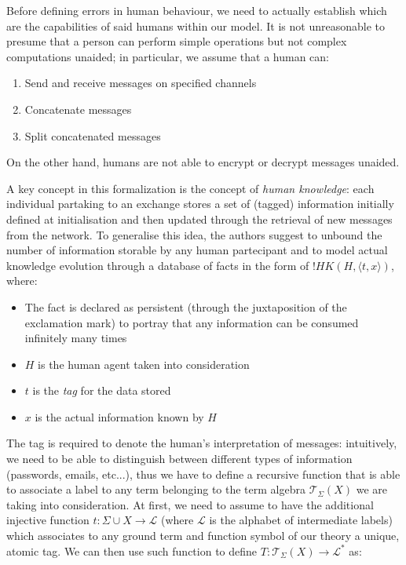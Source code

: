 \documentclass{article}
\begin{document}
Before defining errors in human behaviour, we need to actually establish which are the capabilities of said humans within our model. It is not unreasonable to presume that a person can perform simple operations but not complex computations unaided; in particular, we assume that a human can:

\begin{enumerate}
    \item Send and receive messages on specified channels
    \item Concatenate messages
    \item Split concatenated messages
\end{enumerate}

On the other hand, humans are not able to encrypt or decrypt messages unaided.

A key concept in this formalization is the concept of \textit{human knowledge}: each individual partaking to an exchange stores a set of (tagged) information initially defined at initialisation and then updated through the retrieval of new messages from the network. To generalise this idea, the authors suggest to unbound the number of information storable by any human partecipant and to model actual knowledge evolution through a database of facts in the form of $!HK(H, \langle t, x \rangle)$, where:

\begin{itemize}
    \item The fact is declared as persistent (through the juxtaposition of the exclamation mark) to portray that any information can be consumed infinitely many times
    \item $H$ is the human agent taken into consideration
    \item $t$ is the \textit{tag} for the data stored
    \item $x$ is the actual information known by $H$
\end{itemize}

The tag is required to denote the human's interpretation of messages: intuitively, we need to be able to distinguish between different types of information (passwords, emails, etc...), thus we have to define a recursive function that is able to associate a label to any term belonging to the term algebra $\mathcal{T}_{\Sigma}(X)$ we are taking into consideration. At first, we need to assume to have the additional injective function $t: \Sigma \cup X \to \mathcal{L}$ (where $\mathcal{L}$ is the alphabet of intermediate labels) which associates to any ground term and function symbol of our theory a unique, atomic tag. We can then use such function to define $T:\mathcal{T}_{\Sigma}(X) \to \mathcal{L^*}$ as:
\end{document}
